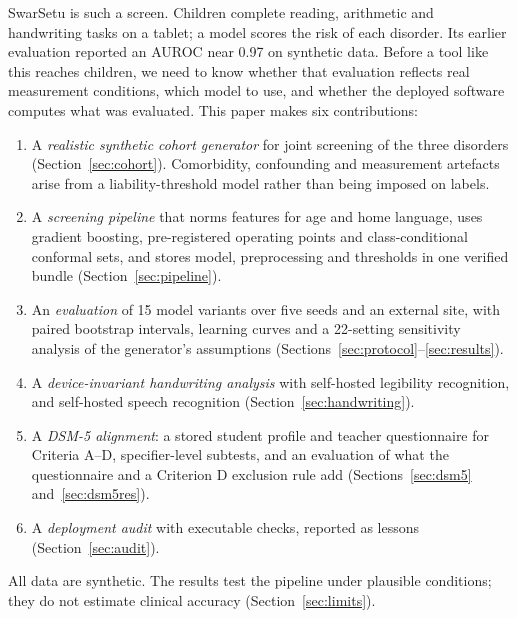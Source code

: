 \documentclass[conference]{IEEEtran}
\begin{document}
SwarSetu is such a screen. Children complete reading, arithmetic and handwriting
tasks on a tablet; a model scores the risk of each disorder. Its earlier evaluation
reported an AUROC near 0.97 on synthetic data. Before a tool like this reaches
children, we need to know whether that evaluation reflects real measurement
conditions, which model to use, and whether the deployed software computes what was
evaluated. This paper makes six contributions:
\begin{enumerate}
\item A \emph{realistic synthetic cohort generator} for joint screening of the three
disorders (Section~\ref{sec:cohort}). Comorbidity, confounding and measurement
artefacts arise from a liability-threshold model rather than being imposed on labels.
\item A \emph{screening pipeline} that norms features for age and home language, uses
gradient boosting, pre-registered operating points and class-conditional conformal
sets, and stores model, preprocessing and thresholds in one verified bundle
(Section~\ref{sec:pipeline}).
\item An \emph{evaluation} of 15 model variants over five seeds and an external site,
with paired bootstrap intervals, learning curves and a 22-setting sensitivity
analysis of the generator's assumptions (Sections~\ref{sec:protocol}--\ref{sec:results}).
\item A \emph{device-invariant handwriting analysis} with self-hosted legibility
recognition, and self-hosted speech recognition (Section~\ref{sec:handwriting}).
\item A \emph{DSM-5 alignment}: a stored student profile and teacher questionnaire for
Criteria A--D, specifier-level subtests, and an evaluation of what the questionnaire
and a Criterion D exclusion rule add (Sections~\ref{sec:dsm5} and~\ref{sec:dsm5res}).
\item A \emph{deployment audit} with executable checks, reported as lessons
(Section~\ref{sec:audit}).
\end{enumerate}
All data are synthetic. The results test the pipeline under plausible conditions;
they do not estimate clinical accuracy (Section~\ref{sec:limits}).

\end{document}

